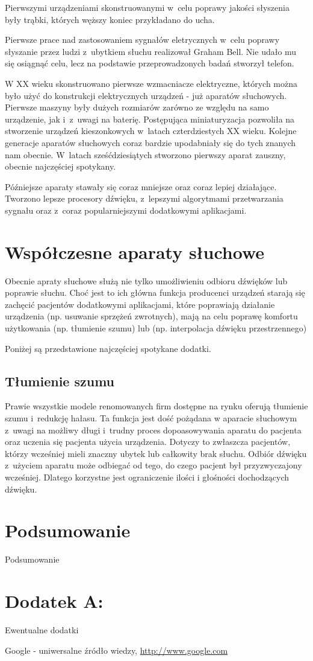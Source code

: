 \documentclass[journal]{IEEEtran}
\begin{document}
Pierwszymi urządzeniami skonstruowanymi w~celu poprawy jakości słyszenia były trąbki, których węższy koniec przykładano do ucha.

Pierwsze prace nad zastosowaniem sygnałów eletrycznych w~celu poprawy słyszanie przez ludzi z~ubytkiem słuchu realizował Graham Bell. Nie udało mu się osiągnąć celu, lecz na podstawie przeprowadzonych badań stworzył telefon.

W XX wieku skonstruowano pierwsze wzmacniacze elektryczne, których można było użyć do konstrukcji elektrycznych urządzeń - już aparatów słuchowych. Pierwsze maszyny były dużych rozmiarów zarówno ze względu na samo urządzenie, jak i~z~uwagi na baterię. Postępująca miniaturyzacja pozwoliła na stworzenie urządzeń kieszonkowych w~latach czterdziestych XX wieku. Kolejne generacje aparatów słuchowych coraz bardzie upodabniały się do tych znanych nam obecnie. W~latach sześćdziesiątych stworzono pierwszy aparat zauszny, obecnie najczęściej spotykany.

Późniejsze aparaty stawały się coraz mniejsze oraz coraz lepiej działające. Tworzono lepsze procesory dźwięku, z~lepszymi algorytmami przetwarzania sygnału oraz z~coraz popularniejszymi dodatkowymi aplikacjami.

\section{Współczesne aparaty słuchowe}

Obecnie apraty słuchowe służą nie tylko umożliwieniu odbioru dźwięków lub poprawie słuchu. Choć jest to ich główna funkcja producenci urządzeń starają się zachęcić pacjentów dodatkowymi aplikacjami, które poprawiają działanie urządzenia (np. usuwanie sprzężeń zwrotnych), mają na celu poprawę komfortu użytkowania (np. tłumienie szumu) lub (np. interpolacja dźwięku przestrzennego)

Poniżej są przedstawione najczęściej spotykane dodatki.

\subsection{Tłumienie szumu}

Prawie wszystkie modele renomowanych firm dostępne na rynku oferują tłumienie szumu i~redukcję hałasu. Ta funkcja jest dość pożądana w aparacie słuchowym z~uwagi na możliwy długi i~trudny proces dopoasowywania aparatu do pacjenta oraz uczenia się pacjenta użycia urządzenia. Dotyczy to zwłaszcza pacjentów, którzy wcześniej mieli znaczny ubytek lub całkowity brak słuchu. Odbiór dźwięku z~użyciem aparatu może odbiegać od tego, do czego pacjent był przyzwyczajony wcześniej. Dlatego korzystne jest ograniczenie ilości i głośności dochodzących dźwięku.


\section{Podsumowanie}

Podsumowanie

\section{Dodatek A: }

Ewentualne dodatki


\begin{thebibliography}{123}
    Google - uniwersalne źródło wiedzy,
        \url{http://www.google.com}
\end{thebibliography}
\end{document}
